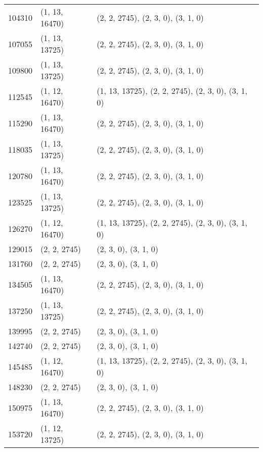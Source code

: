 \begin{center}
{\begin{tabularx}{\textwidth}{p{}|p{}|p{}}
			104310                 & (1, 13, 16470) & (2, 2, 2745), (2, 3, 0), (3, 1, 0)                  \\
			107055                 & (1, 13, 13725) & (2, 2, 2745), (2, 3, 0), (3, 1, 0)                  \\
			109800                 & (1, 13, 13725) & (2, 2, 2745), (2, 3, 0), (3, 1, 0)                  \\
			112545                 & (1, 12, 16470) & (1, 13, 13725), (2, 2, 2745), (2, 3, 0), (3, 1, 0)  \\
			115290                 & (1, 13, 16470) & (2, 2, 2745), (2, 3, 0), (3, 1, 0)                  \\
			118035                 & (1, 13, 13725) & (2, 2, 2745), (2, 3, 0), (3, 1, 0)                  \\
			120780                 & (1, 13, 16470) & (2, 2, 2745), (2, 3, 0), (3, 1, 0)                  \\
			123525                 & (1, 13, 13725) & (2, 2, 2745), (2, 3, 0), (3, 1, 0)                  \\
			126270                 & (1, 12, 16470) & (1, 13, 13725), (2, 2, 2745), (2, 3, 0), (3, 1, 0)  \\
			129015                 & (2, 2, 2745)   & (2, 3, 0), (3, 1, 0)                                \\
			131760                 & (2, 2, 2745)   & (2, 3, 0), (3, 1, 0)                                \\
			134505                 & (1, 13, 16470) & (2, 2, 2745), (2, 3, 0), (3, 1, 0)                  \\
			137250                 & (1, 13, 13725) & (2, 2, 2745), (2, 3, 0), (3, 1, 0)                  \\
			139995                 & (2, 2, 2745)   & (2, 3, 0), (3, 1, 0)                                \\
			142740                 & (2, 2, 2745)   & (2, 3, 0), (3, 1, 0)                                \\
			145485                 & (1, 12, 16470) & (1, 13, 13725), (2, 2, 2745), (2, 3, 0), (3, 1, 0)  \\
			148230                 & (2, 2, 2745)   & (2, 3, 0), (3, 1, 0)                                \\
			150975                 & (1, 13, 16470) & (2, 2, 2745), (2, 3, 0), (3, 1, 0)                  \\
			153720                 & (1, 12, 13725) & (2, 2, 2745), (2, 3, 0), (3, 1, 0)                  \\

\end{tabularx}}
\end{center}
